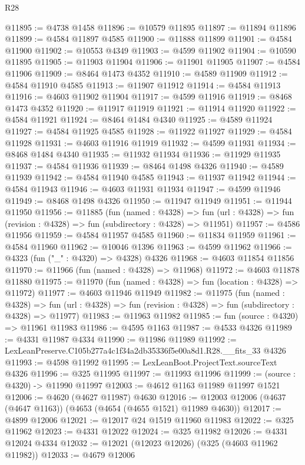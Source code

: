 \begin{lexlean}{R28}
\begin{coremodule}
@11895 := @4738 @1458
@11896 := @10579 @11895
@11897 := @11894 @11896
@11899 := @4584 @11897 @4585
@11900 := @11888 @11899
@11901 := @4584 @11900
@11902 := @10553 @4349
@11903 := @4599 @11902
@11904 := @10590 @11895
@11905 := @11903 @11904
@11906 := @11901 @11905
@11907 := @4584 @11906
@11909 := @8464 @1473 @4352
@11910 := @4589 @11909
@11912 := @4584 @11910 @4585
@11913 := @11907 @11912
@11914 := @4584 @11913
@11916 := @4603 @11902 @11904
@11917 := @4599 @11916
@11919 := @8468 @1473 @4352
@11920 := @11917 @11919
@11921 := @11914 @11920
@11922 := @4584 @11921
@11924 := @8464 @1484 @4340
@11925 := @4589 @11924
@11927 := @4584 @11925 @4585
@11928 := @11922 @11927
@11929 := @4584 @11928
@11931 := @4603 @11916 @11919
@11932 := @4599 @11931
@11934 := @8468 @1484 @4340
@11935 := @11932 @11934
@11936 := @11929 @11935
@11937 := @4584 @11936
@11939 := @8464 @1498 @4326
@11940 := @4589 @11939
@11942 := @4584 @11940 @4585
@11943 := @11937 @11942
@11944 := @4584 @11943
@11946 := @4603 @11931 @11934
@11947 := @4599 @11946
@11949 := @8468 @1498 @4326
@11950 := @11947 @11949
@11951 := @11944 @11950
@11956 := @11885
    (fun (named : @4328) =>
    fun (url : @4328) => fun (revision : @4328) => fun (subdirectory : @4328) => @11951)
@11957 := @4586 @11956
@11959 := @4584 @11957 @4585
@11960 := @11834 @11959
@11961 := @4584 @11960
@11962 := @10046 @1396
@11963 := @4599 @11962
@11966 := @4323 (fun ("_" : @4320) => @4328) @4326
@11968 := @4603 @11854 @11856
@11970 := @11966 (fun (named : @4328) => @11968)
@11972 := @4603 @11878 @11880
@11975 := @11970 (fun (named : @4328) => fun (location : @4328) => @11972)
@11977 := @4603 @11946 @11949
@11982 := @11975
    (fun (named : @4328) =>
    fun (url : @4328) => fun (revision : @4328) => fun (subdirectory : @4328) => @11977)
@11983 := @11963 @11982
@11985 := fun (source : @4320) => @11961 @11983
@11986 := @4595 @1163
@11987 := @4533 @4326
@11989 := @4331 @11987 @4334
@11990 := @11986 @11989
@11992 := LexLeanPreserve.C105b277a4c1f34a2db35336f5e00a8d1.R28.__fits_33 @4326
@11993 := @4598 @11992
@11995 := LexLeanBoot.ProjectText.sourceText @4326
@11996 := @325 @11995
@11997 := @11993 @11996
@11999 := (source : @4320) -> @11990 @11997
@12003 := @4612 @1163 @11989 @11997 @1521
@12006 := @4620 (@4627 @11987) @4630
@12016 := @12003 @12006 (@4637 (@4647 @1163)) (@4653 (@4654 (@4655 @1521) @11989 @4630))
@12017 := @4899 @12006
@12021 := @12017 @24 @1519 @11960 @11983
@12022 := @325 @11962
@12023 := @4331 @12022
@12024 := @325 @11982
@12026 := @4331 @12024 @4334
@12032 := @12021 (@12023 @12026) (@325 (@4603 @11962 @11982))
@12033 := @4679 @12006

\end{coremodule}
\end{lexlean}
